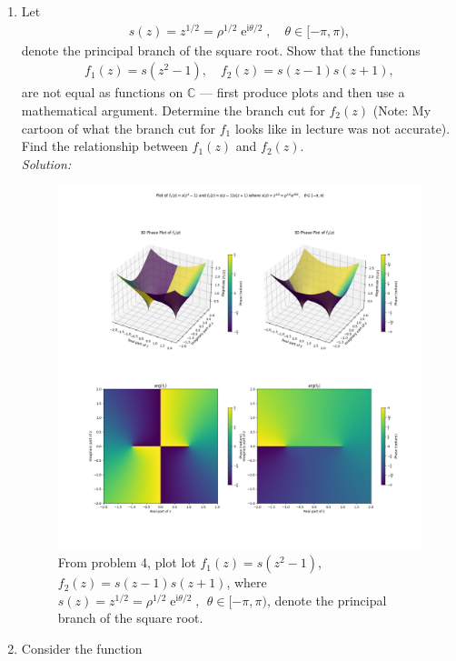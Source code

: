 \documentclass[10pt]{amsart}
\newcommand{\I}{\mathrm{i}}
\DeclareMathOperator{\E}{e}
\theoremstyle{nonumberplain}
\begin{document}
\begin{enumerate}[label={\bf {\arabic*}:}]
\item Let
  \begin{align*}
    s(z) = z^{1/2} = \rho^{1/2} \E^{\I \theta/2}, \quad \theta \in [-\pi,\pi),
  \end{align*}
  denote the principal branch of the square root.  Show that the
  functions
  \begin{align*}
    f_1(z) = s(z^2 -1), \quad f_2(z) = s(z-1) s(z+1),
  \end{align*}
  are not equal as functions on $\mathbb C$ --- first produce plots and then use a mathematical argument.  Determine the branch cut for $f_2(z)$ (Note: My
  cartoon of what the branch cut for $f_1$ looks like in lecture was
  not accurate).  Find the relationship between $f_1(z)$ and $f_2(z)$.\\
\textit{Solution:} \\
\begin{figure}[h]
	\centering
	\includegraphics[width=1\textwidth]{problem_4_vis.png}
 	\caption{
	From problem 4, plot lot $f_1(z) = s(z^2 -1)$, $f_2(z) = s(z-1) s(z+1)$, where $s(z) = z^{1/2} = \rho^{1/2} \E^{\I \theta/2},\:\:
	\theta \in [-\pi,\pi)$, denote the principal branch of the square root.}\label{fig:f1}
\end{figure}
  \item Consider the function
    \begin{align*}

\end{align*}
\end{enumerate}
\end{document}
